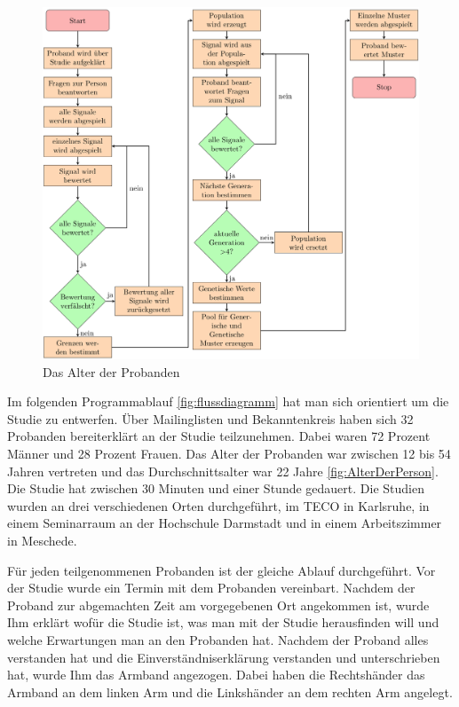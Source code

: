 \begin{figure}[htbp] 
            \centering
   	\includegraphics[width=\textwidth]{pics/analyse/Programmablaufdiagramm.png}
	\caption{Das Alter der Probanden}
	\label{fig:AlterDerPerson}
\end{figure}

Im folgenden Programmablauf \autoref{fig:flussdiagramm} hat man sich orientiert um die Studie zu entwerfen. {\"U}ber Mailinglisten und Bekanntenkreis haben sich 32 Probanden bereiterkl{\"a}rt an der Studie teilzunehmen. Dabei waren 72 Prozent M{\"a}nner und 28 Prozent Frauen. Das Alter der Probanden war zwischen 12 bis 54 Jahren vertreten und das Durchschnittsalter war 22 Jahre \autoref{fig:AlterDerPerson}.  
Die Studie hat zwischen 30 Minuten und einer Stunde gedauert.
Die Studien wurden an drei verschiedenen Orten durchgef{\"u}hrt, im TECO in Karlsruhe, in einem Seminarraum an der Hochschule Darmstadt und in einem Arbeitszimmer in Meschede.

F{\"u}r jeden teilgenommenen Probanden ist der gleiche Ablauf durchgef{\"u}hrt. 
Vor der Studie wurde ein Termin mit dem Probanden vereinbart. Nachdem der Proband zur abgemachten Zeit am vorgegebenen Ort angekommen ist, wurde Ihm erkl{\"a}rt wof{\"u}r die Studie ist, was man mit der Studie herausfinden will und welche Erwartungen man an den Probanden hat. 
Nachdem der Proband alles verstanden hat und die Einverst{\"a}ndniserkl{\"a}rung verstanden und unterschrieben hat, wurde Ihm das Armband angezogen. Dabei haben die Rechtsh{\"a}nder das Armband an dem linken Arm und die Linksh{\"a}nder an dem rechten Arm angelegt.

